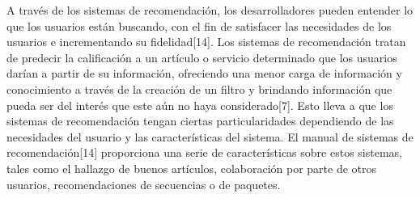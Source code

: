 \documentclass[12pt,letterpaper,openany]{book}
\begin{document}
A través de los sistemas de recomendación, los desarrolladores pueden entender lo que los usuarios están buscando, con el fin de satisfacer las necesidades de los usuarios e incrementando su fidelidad[14]. 
\vspace{5mm}\newline
Los sistemas de recomendación tratan de predecir la calificación a un artículo o servicio determinado que los usuarios darían a partir de su información, ofreciendo una menor carga de información y conocimiento a través de la creación de un filtro y brindando información que pueda ser del interés que este aún no haya considerado[7]. Esto lleva a que los sistemas de recomendación tengan ciertas particularidades dependiendo de las necesidades del usuario y las características del sistema. El manual de sistemas de recomendación[14] proporciona una serie de características sobre estos sistemas, tales como el hallazgo de buenos artículos, colaboración por parte de otros usuarios, recomendaciones de secuencias o de paquetes.
\end{document}
